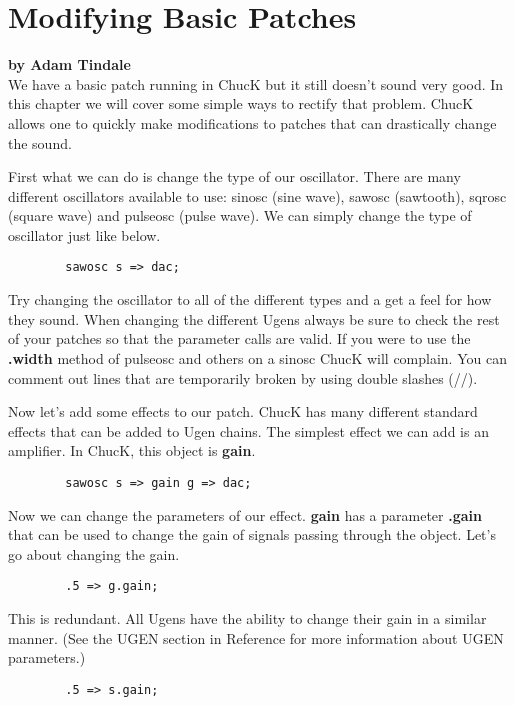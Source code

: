 \section{Modifying Basic Patches}
\textbf{by Adam Tindale}\\

We have a basic patch running in ChucK but it still doesn't sound very good. In this chapter we will cover some simple ways to rectify that problem. ChucK allows one to quickly make modifications to patches that can drastically change the sound.

First what we can do is change the type of our oscillator. There are many different oscillators available to use: sinosc (sine wave), sawosc (sawtooth), sqrosc (square wave) and  pulseosc (pulse wave). We can simply change the type of oscillator just like below. 

\begin{verbatim}
        sawosc s => dac;
\end{verbatim}

Try changing the oscillator to all of the different types and a get a feel for how they sound. When changing the different Ugens always be sure to check the rest of your patches so that the parameter calls are valid. If you were to use the {\bf .width} method of pulseosc and others on a sinosc ChucK will complain. You can comment out lines that are temporarily broken by using double slashes (//).

Now let's add some effects to our patch. ChucK has many different standard effects that can be added to Ugen chains. The simplest effect we can add is an amplifier. In ChucK, this object is {\bf gain}.

\begin{verbatim}
        sawosc s => gain g => dac;
\end{verbatim}

Now we can change the parameters of our effect. {\bf gain} has a parameter {\bf .gain} that can be used to change the gain  of signals passing through the object. Let's go about changing the gain.

\begin{verbatim}
        .5 => g.gain;
\end{verbatim}

This is redundant. All Ugens have the ability to change their gain in a similar manner. (See the UGEN section in Reference for more information about UGEN parameters.)

\begin{verbatim}
        .5 => s.gain;
\end{verbatim}

